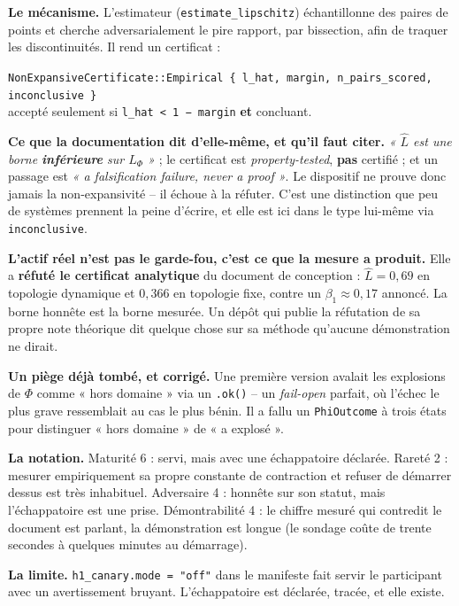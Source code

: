 \documentclass[10pt]{article}
\newcommand{\sz}[1]{{\small\color{grey}\textsf{#1}}}
\newcommand{\code}[1]{\texttt{\small #1}}
\begin{document}
\textbf{Le mécanisme.} L'estimateur \sz{(\code{estimate\_lipschitz})} échantillonne des paires de
points et cherche adversarialement le pire rapport, par bissection, afin de traquer les
discontinuités. Il rend un certificat :

\begin{extrait}\small
\code{NonExpansiveCertificate::Empirical \{ l\_hat, margin, n\_pairs\_scored, inconclusive \}}\\[2pt]
\sz{accepté seulement si} \code{l\_hat < 1 − margin} \sz{\textbf{et} concluant.}
\end{extrait}

\textbf{Ce que la documentation dit d'elle-même, et qu'il faut citer.} \emph{« $\hat{L}$ est une borne
\textbf{inférieure} sur $L_\Phi$ »} ; le certificat est \emph{property-tested}, \textbf{pas} certifié ;
et un passage est \emph{« a falsification failure, never a proof »}. Le dispositif ne prouve donc
jamais la non-expansivité -- il échoue à la réfuter. C'est une distinction que peu de systèmes
prennent la peine d'écrire, et elle est ici dans le type lui-même via \code{inconclusive}.

\textbf{L'actif réel n'est pas le garde-fou, c'est ce que la mesure a produit.} Elle a
\textbf{réfuté le certificat analytique} du document de conception : $\hat{L} = 0{,}69$ en topologie
dynamique et $0{,}366$ en topologie fixe, contre un $\beta_1 \approx 0{,}17$ annoncé. La borne honnête
est la borne mesurée. Un dépôt qui publie la réfutation de sa propre note théorique dit quelque chose
sur sa méthode qu'aucune démonstration ne dirait.

\textbf{Un piège déjà tombé, et corrigé.} Une première version avalait les explosions de $\Phi$ comme
« hors domaine » via un \code{.ok()} -- un \emph{fail-open} parfait, où l'échec le plus grave
ressemblait au cas le plus bénin. Il a fallu un \code{PhiOutcome} à trois états pour distinguer
« hors domaine » de « a explosé ».

\textbf{La notation.} \sz{Maturité 6} : servi, mais avec une échappatoire déclarée. \sz{Rareté 2} :
mesurer empiriquement sa propre constante de contraction et refuser de démarrer dessus est très
inhabituel. \sz{Adversaire 4} : honnête sur son statut, mais l'échappatoire est une prise.
\sz{Démontrabilité 4} : le chiffre mesuré qui contredit le document est parlant, la démonstration est
longue \sz{(le sondage coûte de trente secondes à quelques minutes au démarrage)}.

\textbf{La limite.} \code{h1\_canary.mode = "off"} dans le manifeste fait servir le participant avec
un avertissement bruyant. L'échappatoire est déclarée, tracée, et elle existe.
\end{document}
